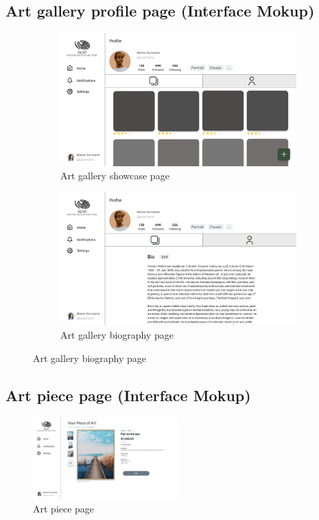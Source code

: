 \subsection{Art gallery profile page (Interface Mokup)}
\begin{figure}[H]
    \centering
\begin{subfigure}[b]{0.49\textwidth}
    \centering
    \includegraphics[width=\textwidth]{images/interface_mockups/Art gallery profile - showcase.pdf}
    \caption{Art gallery showcase page}
\end{subfigure}
\begin{subfigure}[b]{0.49\textwidth}
    \centering
    \includegraphics[width=\textwidth]{images/interface_mockups/Art gallery profile - bio.pdf}
    \caption{Art gallery biography page}
\end{subfigure}
\end{figure}


\subsection{Art piece page (Interface Mokup)}
\begin{figure}[H]
    \centering
    \includegraphics[width=0.5\textwidth]{images/interface_mockups/Art piece page.pdf}
    \caption{Art piece page}
\end{figure}

